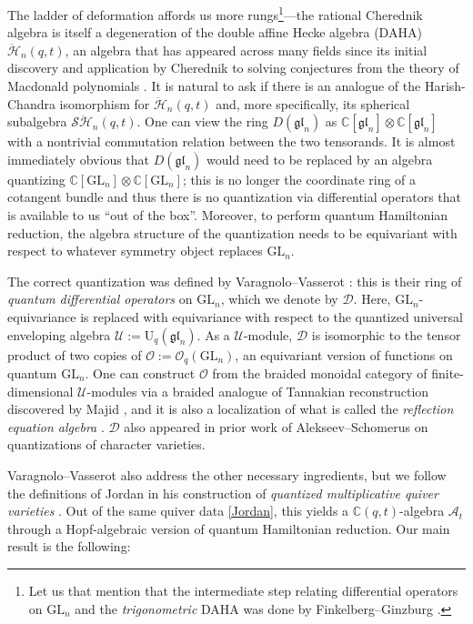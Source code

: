 \documentclass[11pt]{article}
\newcommand{\GL}{\mathrm{GL}}
\newcommand{\rU}{\mathrm{U}}
\theoremstyle{definition}
\newcommand{\CC}{\mathbb{C}}
\newcommand{\OO}{\mathcal{O}}
\newcommand{\UU}{\mathcal{U}}
\newcommand{\DD}{\mathcal{D}}
\newcommand{\SHH}{\mathcal{S}\ddot{\mathcal{H}}}
\newcommand{\HH}{\ddot{\mathcal{H}}}
\begin{document}
The ladder of deformation affords us more rungs\footnote{Let us that mention that the intermediate step relating differential operators on $\GL_n$ and the \textit{trigonometric} DAHA was done by Finkelberg--Ginzburg \cite{FGCurve}.}---the rational Cherednik algebra is itself a degeneration of the double affine Hecke algebra (DAHA) $\HH_n(q,t)$, an algebra that has appeared across many fields since its initial discovery and application by Cherednik to solving conjectures from the theory of Macdonald polynomials \cite{ChereAnnals}.
It is natural to ask if there is an analogue of the Harish-Chandra isomorphism for $\HH_n(q,t)$ and, more specifically, its spherical subalgebra $\SHH_n(q,t)$.
One can view the ring $D(\mathfrak{gl}_n)$ as $\CC[\mathfrak{gl}_n]\otimes\CC[\mathfrak{gl}_n]$ with a nontrivial commutation relation between the two tensorands.
It is almost immediately obvious that $D(\mathfrak{gl}_n)$ would need to be replaced by an algebra quantizing $\CC[\GL_n]\otimes\CC[\GL_n]$; this is no longer the coordinate ring of a cotangent bundle and thus there is no quantization via differential operators that is available to us ``out of the box''.
Moreover, to perform quantum Hamiltonian reduction, the algebra structure of the quantization needs to be equivariant with respect to whatever symmetry object replaces $\GL_n$.

The correct quantization was defined by Varagnolo--Vasserot \cite{VarVassRoot}: this is their ring of \textit{quantum differential operators} on $\GL_n$, which we denote by $\DD$.
Here, $\GL_n$-equivariance is replaced with equivariance with respect to the quantized universal enveloping algebra $\UU:=\rU_q(\mathfrak{gl}_n)$.
As a $\UU$-module, $\DD$ is isomorphic to the tensor product of two copies of $\OO:=\OO_q(\GL_n)$, an equivariant version of functions on quantum $\GL_n$.
One can construct $\OO$ from the braided monoidal category of finite-dimensional $\UU$-modules via a braided analogue of Tannakian reconstruction discovered by Majid \cite{MajidBraided}, and it is also a localization of what is called the \textit{reflection equation algebra} \cite{DonMudRET}.
$\DD$ also appeared in prior work of Alekseev--Schomerus \cite{AlekScho} on quantizations of character varieties.

Varagnolo--Vasserot also address the other necessary ingredients, but we follow the definitions of Jordan in his construction of \textit{quantized multiplicative quiver varieties} \cite{JordanMult}.
Out of the same quiver data \eqref{Jordan}, this yields a $\CC(q,t)$-algebra $\mathcal{A}_t$ through a Hopf-algebraic version of quantum Hamiltonian reduction.
Our main result is the following:
\end{document}
